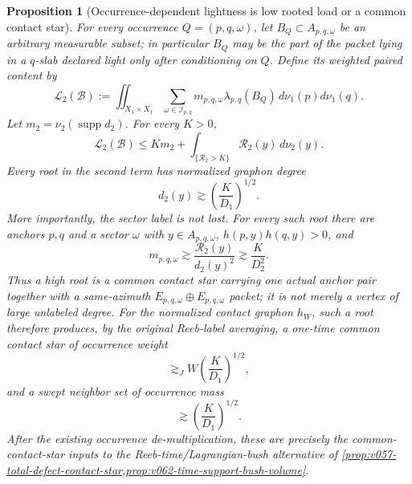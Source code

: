 \documentclass[10pt]{article}
\newtheorem{proposition}[theorem]{Proposition}
\newcommand{\supp}{\operatorname{supp}}
\begin{document}
\begin{proposition}[Occurrence-dependent lightness is low rooted load or a common contact star]
\label{prop:v072-conditional-light-to-star}
For every occurrence \(Q=(p,q,\omega)\), let
\(B_Q\subset A_{p,q,\omega}\) be an arbitrary measurable subset; in particular \(B_Q\) may be the
part of the packet lying in a \(q\)-slab declared light only after conditioning on \(Q\).  Define its
weighted paired content by
\begin{equation}
\label{eq:v072-conditioned-occurrence-content}
\mathcal L_2(\mathscr B)
:=
\iint_{X_1\times X_1}
\sum_{\omega\in\mathscr I_{p,q}}
m_{p,q,\omega}\lambda_{p,q}(B_Q)
\,d\nu_1(p)d\nu_1(q).
\end{equation}
Let \(m_2=\nu_2(\supp d_2)\).  For every \(K>0\),
\begin{equation}
\label{eq:v072-rooted-low-high-split}
\boxed{
\mathcal L_2(\mathscr B)
\le
K m_2
+
\int_{\{\mathcal R_2>K\}}\mathcal R_2(y)\,d\nu_2(y).
}
\end{equation}
Every root in the second term has normalized graphon degree
\begin{equation}
\label{eq:v072-high-root-degree}
\boxed{
d_2(y)
\gtrsim
\left(\frac K{D_1}\right)^{1/2}.
}
\end{equation}
More importantly, the sector label is not lost.  For every such root there are anchors \(p,q\)
and a sector \(\omega\) with \(y\in A_{p,q,\omega}\),
\(h(p,y)h(q,y)>0\), and
\begin{equation}
\label{eq:v072-high-root-flagged-packet}
\boxed{
m_{p,q,\omega}
\gtrsim
\frac{\mathcal R_2(y)}{d_2(y)^2}
\gtrsim
\frac K{D_2^2}.
}
\end{equation}
Thus a high root is a common contact star carrying one actual anchor pair together with a
same-azimuth \(E_{p,q,\omega}\oplus E_{p,q,\omega}\) packet; it is not merely a vertex of large
unlabeled degree.
For the normalized contact graphon \(h_W\), such a root therefore produces, by the original
Reeb-label averaging, a one-time common contact star of occurrence weight
\begin{equation}
\label{eq:v072-high-root-one-time-star}
\boxed{
\gtrsim_J
W\left(\frac K{D_1}\right)^{1/2},
}
\end{equation}
and a swept neighbor set of occurrence mass
\begin{equation}
\label{eq:v072-high-root-swept-star}
\boxed{
\gtrsim
\left(\frac K{D_1}\right)^{1/2}.
}
\end{equation}
After the existing occurrence de-multiplication, these are precisely the common-contact-star inputs
to the Reeb-time/Lagrangian-bush alternative of
\cref{prop:v057-total-defect-contact-star,prop:v062-time-support-bush-volume}.
\end{proposition}
\end{document}
